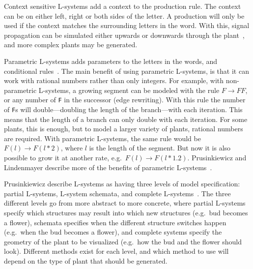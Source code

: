 

Context sensitive \glspl{L-system} add a context to the production rule.
The context can be on either left, right or both sides of the letter.
A production will only be used if the context matches the surrounding letters in the word.
With this, signal propagation can be simulated either upwards or downwards through the plant~\cite{2012Prusinkiewicz}, and more complex plants may be generated.

Parametric \glspl{L-system} adds parameters to the letters in the words, and conditional rules~\cite{2012Prusinkiewicz}.
The main benefit of using parametric \glspl{L-system}, is that it can work with rational numbers rather than only integers.
For example, with non-parametric \glspl{L-system}, a growing segment can be modeled with the rule $F\rightarrow FF$, or any number of \texttt{F} in the successor (edge rewriting).
With this rule the number of \texttt{F}s will double---doubling the length of the branch---with each iteration.
This means that the length of a branch can only double with each iteration.
For some plants, this is enough, but to model a larger variety of plants, rational numbers are required.
With parametric \glspl{L-system}, the same rule would be $F(l)\rightarrow F(l*2)$, where $l$ is the length of the segment.
But now it is also possible to grow it at another rate, e.g.\ $F(l)\rightarrow F(l*1.2)$.
Prusinkiewicz and Lindenmayer describe more of the benefits of parametric \glspl{L-system}~\cite{2012Prusinkiewicz}.

Prusinkiewicz describe \glspl{L-system} as having three levels of model specification: partial \glspl{L-system}, \gls{L-system} schemata, and complete \glspl{L-system}~\cite{2012Prusinkiewicz}.
The three different levels go from more abstract to more concrete, where partial \glspl{L-system} specify which structures may result into which new structures (e.g.\ bud becomes a flower), schemata specifies when the different structure switches happen (e.g.\ when the bud becomes a flower), and complete systems specify the geometry of the plant to be visualized (e.g.\ how the bud and the flower should look).
Different methods exist for each level, and which method to use will depend on the type of plant that should be generated.

